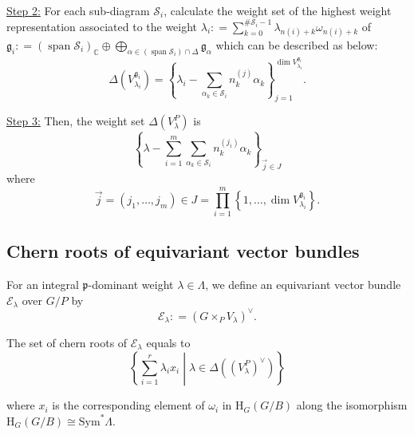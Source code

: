 \documentclass[uplatex,dvipdfmx]{jsarticle}
\newcommand{\defeq}{\mathrel{\mathop:}=}
\newcommand{\Sym}{\mathrm{Sym}}
\begin{document}
\underline{Step 2:}
For each sub-diagram 
$\mathcal{S}_i$, 
calculate the weight set of the highest weight representation
associated to the weight
$\lambda_i 
\defeq
\sum_{k = 0}^{\# \mathcal{S}_i - 1}
\lambda_{n(i) + k} \omega_{n(i) + k}$
of 
$\mathfrak{g}_i
\defeq
(\operatorname{span} \mathcal{S}_i)_\mathbb{C} 
\oplus 
\bigoplus_{\alpha \in (\operatorname{span} \mathcal{S}_i)\cap \Delta}
\mathfrak{g}_\alpha$ which can be described as below:
\begin{equation}
    \Delta\left( 
        V
        ^{\mathfrak{g}_i}
        _{\lambda_i}
    \right)
    =
    \left\{ 
        \lambda_i - \sum_{\alpha_k \in \mathcal{S}_i} n_k^{(j)} \alpha_k
    \right\}
    _{j = 1}
    ^{\operatorname{dim}
        V
        ^{\mathfrak{g}_i}
        _{\lambda_i}}.
\end{equation}

\underline{Step 3:}
Then, the weight set 
$\Delta(V_\lambda^P)$
is
\begin{equation}
    \left\{ 
        \lambda 
        - 
        \sum_{i = 1}^m
        \sum_{\alpha_k \in \mathcal{S}_i} 
        n_k^{(j_i)} \alpha_k
    \right\}_{\vec{j} \in J}
\end{equation}
where
\begin{equation}
    \vec{j}
    =
    \left( j_1, \ldots, j_m \right)
    \in
    J
    =
    \prod_{i = 1}^m
    \left\{ 1, \ldots, \operatorname{dim} V^{\mathfrak{g}_i}_{\lambda_i} \right\}.
\end{equation}

\subsection{Chern roots of equivariant vector bundles}

For an integral
$\mathfrak{p}$-dominant
weight
$\lambda \in \Lambda$,
we define an equivariant vector bundle 
$\mathcal{E}_\lambda$
over
$G/P$
by
\begin{equation}
    \mathcal{E}_\lambda
    \defeq
    \left( 
        G
        \times_P
        V_\lambda
     \right)^{\vee}.
\end{equation}

The set of chern roots of
$\mathcal{E}_\lambda$
equals to
\begin{equation}
    \left\{ 
        \sum_{i = 1}^r
        \lambda_i
        x_i
        \middle|
        \lambda \in \Delta((V_\lambda^P)^{\vee})
    \right\}
\end{equation}

where
$x_i$
is the corresponding element of
$\omega_i$
in
$\mathrm{H}_G(G/B)$
along the isomorphism
$\mathrm{H}_G(G/B) \cong \Sym^* \Lambda$.
\end{document}
